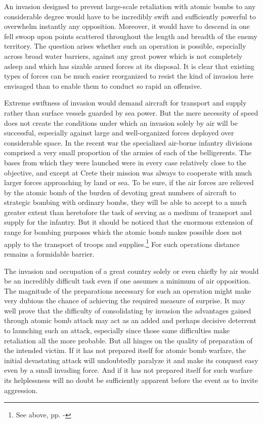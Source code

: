 An invasion designed to prevent large-scale retaliation with atomic bombs to any considerable degree would have to be incredibly swift and sufficiently powerful to overwhelm instantly any opposition. Moreover, it would have to descend in one fell swoop upon points scattered throughout the length and breadth of the enemy territory. The question arises whether such an operation is possible, especially across broad water barriers, against any great power which is not completely asleep and which has sizable armed forces at its disposal. It is clear that existing types of forces can be much easier reorganized to resist the kind of invasion here envisaged than to enable them to conduct so rapid an offensive.

Extreme swiftness of invasion would demand aircraft for transport and supply rather than surface vessels guarded by sea power. But the mere necessity of speed does not create the conditions under which an invasion solely by air will be successful, especially against large and well-organized forces deployed over considerable space. In the recent war the specialized air-borne infantry divisions comprised a very small proportion of the armies of each of the belligerents. The bases from which they were launched were in every case relatively close to the objective, and except at Crete their mission was always to cooperate with much larger forces approaching by land or sea. To be sure, if the air forces are relieved by the atomic bomb of the burden of devoting great numbers of aircraft to strategic bombing with ordinary bombs, they will be able to accept to a much greater extent than heretofore the task of serving as a medium of transport and supply for the infantry. But it should be noticed that the enormous extension of range for bombing purposes which the atomic bomb makes possible does not apply to the transport of troops and supplies.\footnote{See above, pp. \pageref{I-range1}-\pageref{I-range2}} For such operations distance remains a formidable barrier.

The invasion and occupation of a great country solely or even chiefly by air would be an incredibly difficult task even if one assumes a minimum of air opposition. The magnitude of the preparations necessary for such an operation might make very dubious the chance of achieving the required measure of surprise. It may well prove that the difficulty of consolidating by invasion the advantages gained through atomic bomb attack may act as an added and perhaps decisive deterrent to launching such an attack, especially since those same difficulties make retaliation all the more probable. But all hinges on the quality of preparation of the intended victim. If it has not prepared itself for atomic bomb warfare, the initial devastating attack will undoubtedly paralyze it and make its conquest easy even by a small invading force. And if it has not prepared itself for such warfare its helplessness will no doubt be sufficiently apparent before the event as to invite aggression.

